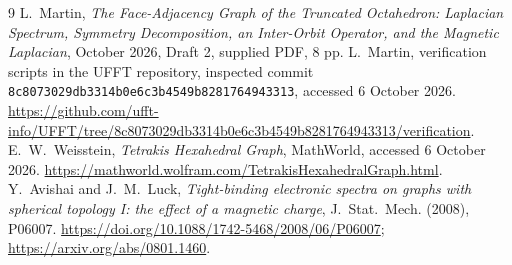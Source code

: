 \documentclass[11pt,a4paper]{article}
\begin{document}
\begin{thebibliography}{9}
 L.~Martin, \emph{The Face-Adjacency Graph of the Truncated Octahedron: Laplacian Spectrum, Symmetry Decomposition, an Inter-Orbit Operator, and the Magnetic Laplacian}, October 2026, Draft 2, supplied PDF, 8 pp.
 L.~Martin, verification scripts in the UFFT repository, inspected commit \texttt{8c8073029db3314b0e6c3b4549b8281764943313}, accessed 6 October 2026. \url{https://github.com/ufft-info/UFFT/tree/8c8073029db3314b0e6c3b4549b8281764943313/verification}.
 E.~W.~Weisstein, \emph{Tetrakis Hexahedral Graph}, MathWorld, accessed 6 October 2026. \url{https://mathworld.wolfram.com/TetrakisHexahedralGraph.html}.
 Y.~Avishai and J.~M.~Luck, \emph{Tight-binding electronic spectra on graphs with spherical topology I: the effect of a magnetic charge}, J.~Stat.~Mech. (2008), P06007. \url{https://doi.org/10.1088/1742-5468/2008/06/P06007}; \url{https://arxiv.org/abs/0801.1460}.
\end{thebibliography}
\end{document}
